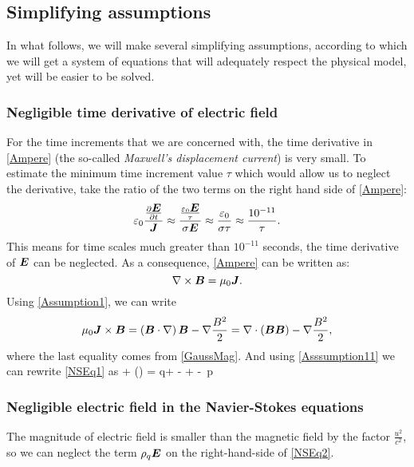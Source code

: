\subsection{Simplifying assumptions}
In what follows, we will make several simplifying assumptions, according to which we will get a system of equations that will adequately respect the physical model, yet will be easier to be solved.
\subsubsection{Negligible time derivative of electric field}
For the time increments that we are concerned with, the time derivative in \cref{Ampere} (the so-called \textit{Maxwell's displacement current}) is
very small. To estimate the minimum time increment value $\tau$ which would allow us to neglect the derivative, take the ratio of the two terms on the right hand side of \cref{Ampere}:
\begin{equation}
\varepsilon_0 \frac{\frac{\partial{\mbox{\boldmath $E$}}}{\partial{t}}}{\mbox{\boldmath $J$}} \approx \frac{\frac{\varepsilon_0 \mbox{\boldmath $E$}}{\tau}}{\sigma\mbox{\boldmath $E$}} \approx \frac{\varepsilon_0}{\sigma \tau} \approx \frac{10^{-11}}{\tau}.
\end{equation}
This means for time scales much greater than $10^{-11}$ seconds, the time derivative of $\mbox{\boldmath $E$}$ can be neglected. As a consequence, \cref{Ampere} can be written as:
\begin{equation}
\label{Assumption1} \nabla \times \mbox{\boldmath $B$} = \mu_0 \mbox{\boldmath $J$}.
\end{equation}
Using \cref{Assumption1}, we can write
\begin{equation}
\label{Asssumption11} \mu_0 \mbox{\boldmath $J$} \times \mbox{\boldmath $B$} = \left(\mbox{\boldmath $B$}\cdot\nabla\right)\mbox{\boldmath $B$} - \nabla\frac{B^2}{2} = \nabla\cdot\left(\mbox{\boldmath $B$}\mbox{\boldmath $B$}\right) - \nabla\frac{B^2}{2},
\end{equation}
where the last equality comes from \cref{GaussMag}. And using \cref{Asssumption11} we can rewrite \cref{NSEq1} as
\be
\label{NSEq2}  + \nabla\cdot\left(\bfpi\otimes\bfu\right) =  q\bfE + \nabla\cdot\lo{}\bfB\bfB - \ro + \rho\bfg - \nabla\,p
\ee

\subsubsection{Negligible electric field in the Navier-Stokes equations}
The magnitude of electric field is smaller than the magnetic field by the factor $\frac{u^2}{c^2}$, so we can neglect the term $\rho_q\mbox{\boldmath $E$}$ on the right-hand-side of \cref{NSEq2}.

